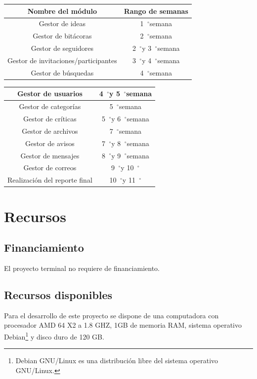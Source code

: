\documentclass[11pt,letterpaper,titlepage]{article}
\newcommand{\grad}{\hspace{-2mm}$\phantom{a}^{\circ}$}
\begin{document}
\begin{center}
\begin{tabular}{|c|c|}\hline
Nombre del m\'odulo & Rango de semanas\\ \hline\hline
Gestor de ideas&1\grad semana \\ \hline
Gestor de bit\'acoras&2\grad semana \\ \hline
Gestor de seguidores&2\grad y 3\grad semana\\ \hline
Gestor de invitaciones/participantes&3\grad y 4\grad semana \\ \hline
Gestor de b\'usquedas&4\grad semana \\ \hline
\end{tabular}
\end{center}
\begin{center}
\begin{tabular}{|c|c|}\hline
Gestor de usuarios&4\grad y 5\grad semana \\ \hline
Gestor de categor\'ias&5\grad semana \\ \hline
Gestor de cr\'iticas&5\grad y 6\grad semana \\ \hline
Gestor de archivos&7\grad semana\\ \hline
Gestor de avisos&7\grad y 8\grad semana\\ \hline
Gestor de mensajes&8\grad y 9\grad semana\\ \hline
Gestor de correos&9\grad y 10\grad \\ \hline
Realizaci\'on del reporte final&10\grad y 11\grad \\ \hline
\end{tabular}
\end{center}



\section{Recursos}
\subsection{Financiamiento}
El proyecto terminal no requiere de financiamiento.
\subsection{Recursos disponibles}
Para el desarrollo de este proyecto se dispone de una computadora con  procesador AMD 64 X2  a 1.8 GHZ, 1GB de memoria RAM, sistema operativo Debian\footnote{Debian GNU/Linux es una distribuci\'on libre del sistema operativo GNU/Linux.}\cite{debian} y disco duro de 120 GB.
\end{document}
